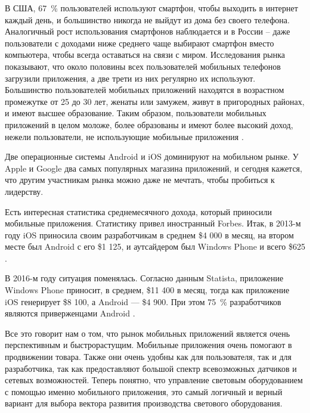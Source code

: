 В США, 67~\% пользователей используют смартфон, чтобы выходить в интернет каждый день, и большинство никогда не выйдут из дома без своего телефона. Аналогичный рост использования смартфонов наблюдается и в России – даже пользователи с доходами ниже среднего чаще выбирают смартфон вместо компьютера, чтобы всегда оставаться на связи с миром. Исследования рынка показывают, что около половины всех пользователей мобильных телефонов загрузили приложения, а две трети из них регулярно их используют. Большинство пользователей мобильных приложений находятся в возрастном промежутке от 25 до 30 лет, женаты или замужем, живут в пригородных районах, и имеют высшее образование. Таким образом, пользователи мобильных приложений в целом моложе, более образованы и имеют более высокий доход, нежели пользователи, не использующие мобильные приложения \cite{mobile_market}.

Две операционные системы Android и iOS доминируют на мобильном рынке. У Apple и Google два самых популярных магазина приложений, и сегодня кажется, что другим участникам рынка можно даже не мечтать, чтобы пробиться к лидерству.

Есть интересная статистика среднемесячного дохода, который приносили мобильные приложения. Статистику привел иностранный Forbes. Итак, в 2013-м году iOS приносила своим разработчикам в среднем \$4 000 в месяц, на втором месте был Android с его \$1 125, и аутсайдером был Windows Phone и всего \$625 \cite{mobile_tendency}.

В 2016-м году ситуация поменялась. Согласно данным Statista, приложение Windows Phone приносит, в среднем, \$11 400 в месяц, тогда как приложение iOS генерирует \$8 100, а Android — \$4 900. При этом 75~\% разработчиков являются приверженцами Android \cite{mobile_tendency}.

Все это говорит нам о том, что рынок мобильных приложений является очень перспективным и быстрорастущим. Мобильные приложения очень помогают в продвижении товара. Также они очень удобны как для пользователя, так и для разработчика, так как предоставляют большой спектр всевозможных датчиков и сетевых возможностей. Теперь понятно, что управление световым оборудованием с помощью именно мобильного приложения, это самый логичный и верный вариант для выбора вектора развития производства светового оборудования.